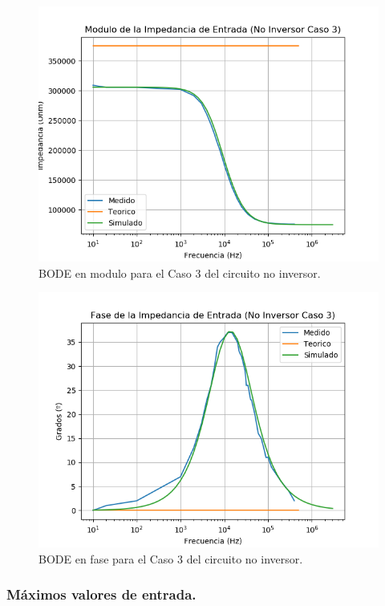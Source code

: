 \begin{figure}[H]	
	\centering
	\includegraphics[width=\textwidth]{Ejercicio1/Imagenes/ZinC3_Noinv.png}
	\caption{BODE en modulo para el Caso 3 del circuito no inversor.}
	\label{fig:NoInvCompZinC3}
\end{figure} 

\begin{figure}[H]	
	\centering
	\includegraphics[width=\textwidth]{Ejercicio1/Imagenes/ZinphC3_Noinv.png}
	\caption{BODE en fase para el Caso 3 del circuito no inversor.}
	\label{fig:CompZinphC3}
\end{figure}

\subsubsection{Máximos valores de entrada.}

